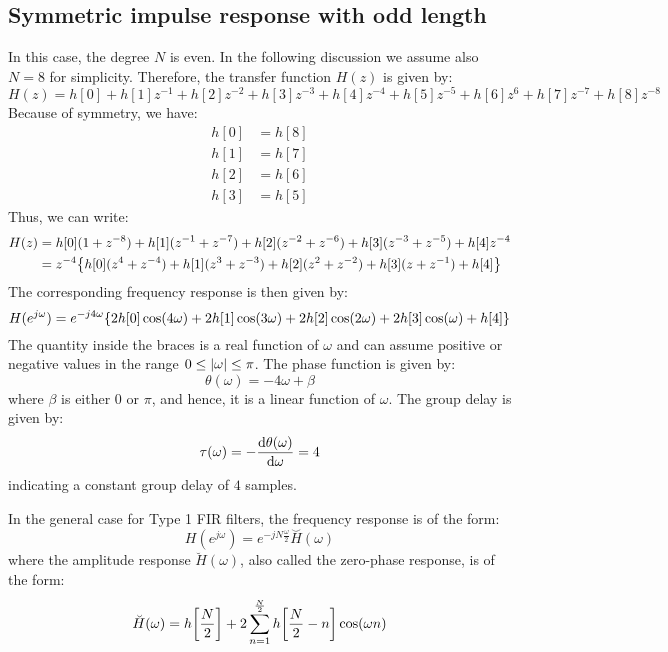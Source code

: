 \documentclass[../../main/main.tex]{subfiles}
\begin{document}
\subsection{Symmetric impulse response with odd length}
In this case, the degree \( N \) is even. In the following discussion we assume also \( N = 8 \) for simplicity. Therefore, the transfer function \( H(z) \) is given by:
\begin{equation}
    H(z)
    =
    h[0] + h[1]z^{-1} + h[2]z^{-2} + h[3]z^{-3} + h[4]z^{-4} + h[5]z^{-5} + h[6]z^{6} + h[7]z^{-7} + h[8]z^{-8}
    \label{eq:L20_S15_1}
\end{equation}
Because of symmetry, we have:
\begin{align}
    h[0] &= h[8]    \\
    h[1] &= h[7]    \\
    h[2] &= h[6]    \\
    h[3] &= h[5]
\end{align}
Thus, we can write:
\begin{align}
    H(z)
    &=
        h[0](1 + z^{-8}) + h[1](z^{-1} + z^{-7}) + h[2](z^{-2} + z^{-6}) + h[3](z^{-3} + z^{-5}) + h[4]z^{-4}   \nonumber   \\
    &=
        z^{-4} \qty{h[0](z^{4} + z^{-4}) + h[1](z^{3} + z^{-3}) + h[2](z^{2} + z^{-2}) + h[3](z + z^{-1}) + h[4]}
\end{align}
The corresponding frequency response is then given by:
\begin{equation}
    H(e^{j\omega})
    =
    e^{-j4\omega} \qty{2h[0]\cos(4\omega) + 2h[1]\cos(3\omega) + 2h[2]\cos(2\omega) + 2h[3]\cos(\omega) + h[4]}
    \label{eq:L20_S17_1}
\end{equation}
The quantity inside the braces is a real function of \( \omega \) and can assume positive or negative values in the range \( 0 \le \abs{\omega} \le \pi \). The phase function is given by:
\begin{equation}
    \theta(\omega)
    =
    -4\omega + \beta
    \label{eq:L20_S18_1}
\end{equation}
where \( \beta \) is either \( 0 \) or \( \pi \), and hence, it is a linear function of \( \omega \). The group delay is given by:
\begin{equation}
    \tau(\omega)
    =
    - \dv{\theta(\omega)}{\omega}
    =
    4
    \label{eq:L20_S18_2}
\end{equation}
indicating a constant group delay of \( 4 \) samples.

In the general case for Type 1 FIR filters, the frequency response is of the form:
\begin{equation}
    H(e^{j\omega})
    =
    e^{-jN \frac{\omega}{2}} \overset{\smallsmile}{H}(\omega)
    \label{eq:L20_S19_1}
\end{equation}
where the amplitude response \( \breve{H}(\omega) \), also called the zero-phase response, is of the form:
\begin{equation}
    \breve{H}(\omega)
    =
    h\qty[\frac{N}{2}] + 2 \sum_{n=1}^{\frac{N}{2}} h\qty[\frac{N}{2} - n] \cos(\omega n)
    \label{eq:L20_S19_2}
\end{equation}
\end{document}
